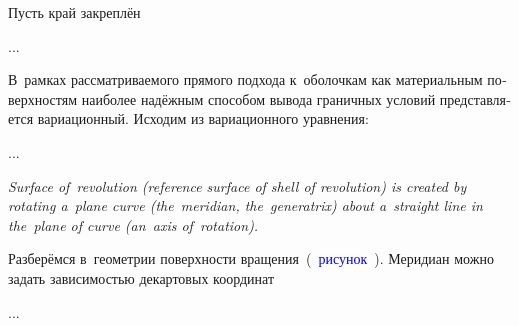 

\begin{otherlanguage}{russian}

Пусть край закреплён

...



\end{otherlanguage}



\begin{otherlanguage}{russian}

В~рамках рассматриваемого прямого подхода к~оболочкам как материальным поверхностям наиболее надёжным способом вывода граничных условий представляется вариационный.
Исходим из вариационного уравнения:

...



\end{otherlanguage}



\noindent
\emph{Surface of~revolution (reference surface of shell of revolution) is created by rotating a~plane curve (the~meridian, the~generatrix) about a~straight line in the~plane of curve (an~axis of~rotation).}

\begin{otherlanguage}{russian}

Разберёмся в~геометрии поверхности вращения~(~\textcolor{blue}{рисунок}~).
Меридиан можно задать зависимостью декартовых координат

...



\end{otherlanguage}

